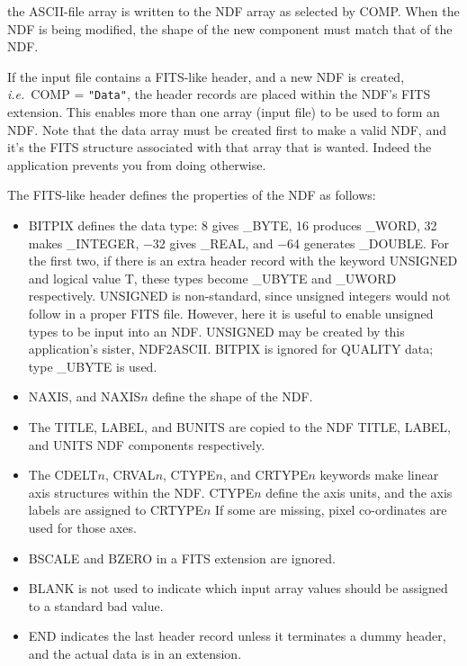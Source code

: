 {{{         \sstitem
            the ASCII-file array is written to the NDF array as
            selected by COMP.  When the NDF is being modified, the shape
            of the new component must match that of the NDF.

         \sstitem
            If the input file contains a FITS-like header, and a new
            NDF is created, {\it i.e.}\ COMP = {\tt "Data"}, the header records are
            placed within the NDF's FITS extension.  This enables more
            than one array (input file) to be used to form an NDF.  Note
            that the data array must be created first to make a valid NDF,
            and it's the FITS structure associated with that array that is
            wanted.  Indeed the application prevents you from doing
            otherwise.

         \sstitem
            The FITS-like header defines the properties of the NDF as
            follows:
            \begin{itemize}
            \item BITPIX defines the data type: 8 gives \_BYTE, 16 produces
            \_WORD, 32 makes \_INTEGER, $-$32 gives \_REAL, and $-$64 generates
            \_DOUBLE.  For the first two, if there is an extra header
            record with the keyword UNSIGNED and logical value T, these
            types become \_UBYTE and \_UWORD respectively.  UNSIGNED is
            non-standard, since unsigned integers would not follow in a
            proper FITS file.  However, here it is useful to enable
            unsigned types to be input into an NDF.  UNSIGNED may be
            created by this application's sister, NDF2ASCII.  BITPIX is
            ignored for QUALITY data; type \_UBYTE is used.
            \item NAXIS, and NAXIS$n$ define the shape of the NDF.
            \item The TITLE, LABEL, and BUNITS are copied to the NDF
            TITLE, LABEL, and UNITS NDF components respectively.
            \item The CDELT$n$, CRVAL$n$, CTYPE$n$, and CRTYPE$n$ keywords make
            linear axis structures within the NDF.  CTYPE$n$ define the
            axis units, and the axis labels are assigned to CRTYPE$n$ If
            some are missing, pixel co-ordinates are used for those
            axes.
            \item BSCALE and BZERO in a FITS extension are ignored.
            \item BLANK is not used to indicate which input array values
            should be assigned to a standard bad value.
            \item END indicates the last header record unless it
            terminates a dummy header, and the actual data is in an
            extension.
            \end{itemize}

}}}
